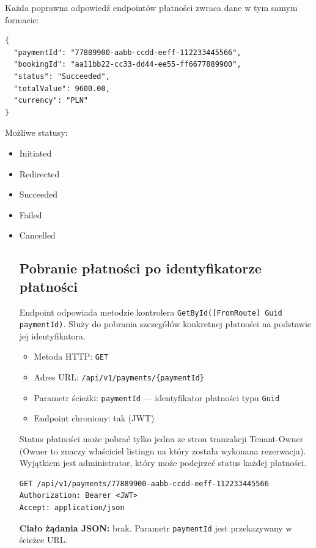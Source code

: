 \documentclass[11pt, a4paper]{article}
\begin{document}
Każda poprawna odpowiedź endpointów płatności zwraca dane w tym samym formacie:

\begin{lstlisting}[style=json,caption={Struktura odpowiedzi — PaymentDTO}]
{
  "paymentId": "77889900-aabb-ccdd-eeff-112233445566",
  "bookingId": "aa11bb22-cc33-dd44-ee55-ff6677889900",
  "status": "Succeeded",
  "totalValue": 9600.00,
  "currency": "PLN"
}
\end{lstlisting}

Możliwe statusy:
\begin{itemize}
  \item Initiated
  \item Redirected
  \item Succeeded
  \item Failed
  \item Cancelled
\subsection{Pobranie płatności po identyfikatorze płatności}

Endpoint odpowiada metodzie kontrolera \texttt{GetById([FromRoute] Guid paymentId)}.
Służy do pobrania szczegółów konkretnej płatności na podstawie jej identyfikatora.

\begin{itemize}
    \item Metoda HTTP: \texttt{GET}
    \item Adres URL: \texttt{/api/v1/payments/\{paymentId\}}
    \item Parametr ścieżki: \texttt{paymentId} --- identyfikator płatności typu \texttt{Guid}
    \item Endpoint chroniony: tak (JWT)
\end{itemize}

Status płatności może pobrać tylko jedna ze stron tranzakcji Tenant-Owner (Owner to znaczy właściciel listingu na który została wykonana rezerwacja). Wyjątkiem jest administrator, który może podejrzeć status każdej płatności.

\begin{lstlisting}[style=http,caption={Żądanie HTTP — pobranie płatności po paymentId}]
GET /api/v1/payments/77889900-aabb-ccdd-eeff-112233445566
Authorization: Bearer <JWT>
Accept: application/json
\end{lstlisting}

\noindent\textbf{Ciało żądania JSON:} brak. Parametr \texttt{paymentId} jest przekazywany w ścieżce URL.


\end{itemize}
\end{document}

